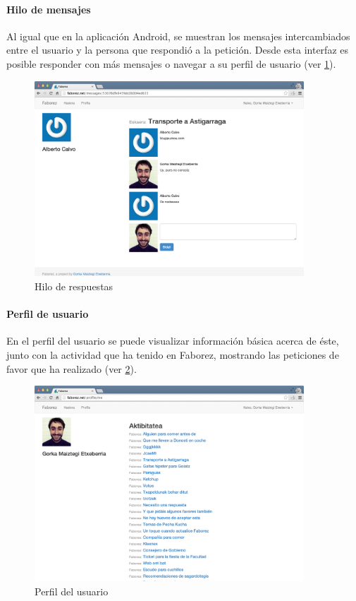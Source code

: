 \documentclass[main]{subfiles}
\begin{document}
\paragraph{Hilo de mensajes}
Al igual que en la aplicación Android, se muestran los mensajes intercambiados entre el usuario y la persona que respondió a la petición. Desde esta interfaz es posible responder con más mensajes o navegar a su perfil de usuario (ver \cref{fig:webapp-reply}).

\begin{figure}
  \centering
  \includegraphics[width=0.9\textwidth]{images/webapp-reply}
  \caption{Hilo de respuestas}
  \label{fig:webapp-reply}
\end{figure}

\paragraph{Perfil de usuario}
En el perfil del usuario se puede visualizar información básica acerca de éste, junto con la actividad que ha tenido en Faborez, mostrando las peticiones de favor que ha realizado (ver \cref{fig:webapp-user}).

\begin{figure}
  \centering
  \includegraphics[width=0.9\textwidth]{images/webapp-user}
  \caption{Perfil del usuario}
  \label{fig:webapp-user}
\end{figure}
\end{document}
